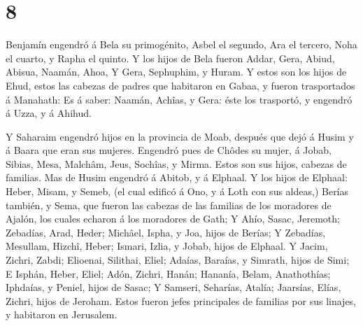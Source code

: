 \hypertarget{section-7}{%
\section{8}\label{section-7}}

 Benjamín engendró á Bela su primogénito, Asbel el segundo,
Ara el tercero,  Noha el cuarto, y Rapha el quinto.
 Y los hijos de Bela fueron Addar, Gera, Abiud, 
Abisua, Naamán, Ahoa,  Y Gera, Sephuphim, y Huram.
 Y estos son los hijos de Ehud, estos las cabezas de padres
que habitaron en Gabaa, y fueron trasportados á Manahath: 
Es á saber: Naamán, Achîas, y Gera: éste los trasportó, y engendró á
Uzza, y á Ahihud.

 Y Saharaim engendró hijos en la provincia de Moab, después
que dejó á Husim y á Baara que eran sus mujeres.  Engendró
pues de Chôdes su mujer, á Jobab, Sibias, Mesa, Malchâm, 
Jeus, Sochîas, y Mirma. Estos son sus hijos, cabezas de familias.
 Mas de Husim engendró á Abitob, y á Elphaal. 
Y los hijos de Elphaal: Heber, Misam, y Semeb, (el cual edificó á Ono, y
á Loth con sus aldeas,)  Berías también, y Sema, que fueron
las cabezas de las familias de los moradores de Ajalón, los cuales
echaron á los moradores de Gath;  Y Ahío, Sasac, Jeremoth;
 Zebadías, Arad, Heder;  Michâel, Ispha, y
Joa, hijos de Berías;  Y Zebadías, Mesullam, Hizchî, Heber;
 Ismari, Izlia, y Jobab, hijos de Elphaal.  Y
Jacim, Zichri, Zabdi;  Elioenai, Silithai, Eliel;
 Adaías, Baraías, y Simrath, hijos de Simi;  E
Isphán, Heber, Eliel;  Adón, Zichri, Hanán; 
Hananía, Belam, Anathothías;  Iphdaías, y Peniel, hijos de
Sasac;  Y Samseri, Seharías, Atalía; 
Jaarsías, Elías, Zichri, hijos de Jeroham.  Estos fueron
jefes principales de familias por sus linajes, y habitaron en Jerusalem.

